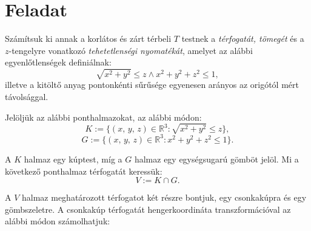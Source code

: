 \documentclass[12pt]{article}
\newcommand{\R}{\mathbb{R}}
\begin{document}
    \newpage
    \section{Feladat}
    Számítsuk ki annak a korlátos és zárt térbeli $T$ testnek a \textit{térfogatát, tömegét} és a $z$-tengelyre vonatkozó \textit{tehetetlenségi nyomatékát}, amelyet az alábbi egyenlőtlenségek definiálnak:
    \[
        \sqrt{x^2 + y^2} \leq z \wedge x^2 + y^2 + z^2 \leq 1,
    \]
    illetve a kitöltő anyag pontonkénti sűrűsége egyenesen arányos az origótól mért távolsággal.


    Jelöljük az alábbi ponthalmazokat, az alábbi módon:
    \[
        K := \{ (x, \, y, \, z) \in \R^3 : \sqrt{x^2 + y^2} \leq z \},
    \]
    \[
        G := \{ (x, \, y, \, z) \in \R^3 : x^2 + y^2 + z^2 \leq 1 \}.
    \]

    A $K$ halmaz egy kúptest, míg a $G$ halmaz egy egységsugarú gömböt jelöl. Mi a következő ponthalmaz térfogatát keressük:
    \[
        V := K \cap G.
    \]

    A $V$ halmaz meghatározott térfogatot két részre bontjuk, egy csonkakúpra és egy gömbszeletre. A csonkakúp térfogatát hengerkoordináta transzformációval az alábbi módon számolhatjuk:
\end{document}
